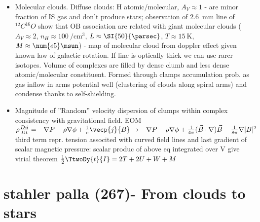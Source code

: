 \begin{itemize}
Thermal dust emission $T_d$ different from gas ($\frac{\nu_M}{T}=\SI{5.88e10}{\hertz\per\kelvin}$, $\lambda_MT=\SI{0.29}{\cm\kelvin}$). Efficiency of extinction: $\rho\kappa_{\nu}=n_d\sigma_dQ_{\nu}$, $Q_{\lambda}=0.14\frac{A_{\lambda}}{E_{B-V}}$ - $Q_{\lambda}\propto\invers{\lambda}$ in optical, local maximum at longer $\lambda=\SI{10}{\micro\meter}$, peak in UV \SI{2200}{\angstrom} - at far IR and mm ISM is transparent so we observe emission from heated dust clouds. Received flux $F_{\lambda}=B_{\lambda}(T_d)\Delta\Omega\Delta\tau_{\lambda}$ that yields $\Delta_{\lambda}(\ll1)$ ($T_d$and $A_V$ determination is problematic so $Q_{\lambda}$ is poorly determined): $\SI{30}{\micro\meter}\leq\lambda\SI{1}{\milli\meter}$ $\lambda\expy{-\beta}$ - physical agglomeration in denser regions. Gemoteric cross-section per H atom $\Sigma_d=\frac{n_d\sigma_d}{n_H}=\frac{(Ln_d)\sigma_d}{(Ln_H)}$.
\item Molecular clouds. Diffuse clouds: H atomic/molecular, $A_V\approx1$ - are minor fraction of IS gas and don't produce stars; observation of \SI{2.6}{\milli\meter} line of $^{12}C^{16}O$ show that OB association are related with giant molecular clouds ($A_V\approx2$, $n_H\approx\SI{100}{\per\cubic\cm}$, $L\approx\SI{50}{\parsec}$, $T\approx\SI{15}{\kelvin}$, $M\approx\num{e5}\msun$) - map of molecular cloud from doppler effect given known law of galactic rotation. If line is optically thick we can use rarer isotopes. Volume of complexes are filled by dense clumb and less dense atomic/molecular constituent. Formed through clamps accumulation prob. as gas inflow in arms potential well (clustering of clouds along spiral arms) and condense thanks to self-shielding.
\item Magnitude of ''Random'' velocity dispersion of clumps within complex consistency with gravitational field. EOM $\rho\frac{D\vec{u}}{Dt}=-\nabla P-\rho\nabla\phi+\frac{1}{c}\vecp{j}{B}\to-\nabla P-\rho\nabla\phi+\frac{1}{4\pi}(\vec{B}\cdot\nabla)\vec{B}-\frac{1}{8\pi}\nabla|B|^2$ third term repr. tension associted with curved field lines and last gradient of scalar magnetic pressure: scalar produc of above eq integrated over V give virial theorem $\frac{1}{2}\TtwoDy{t}{I}=2T+2U+W+M$
\end{itemize}

\chapter{stahler palla (267)- From clouds to stars}

